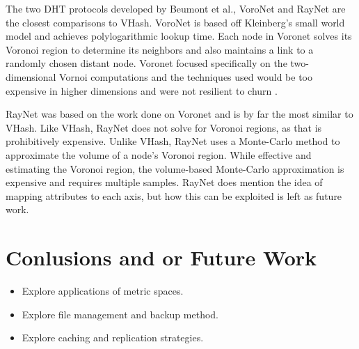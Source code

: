 \documentclass{IEEEtran}
\begin{document}
The two DHT protocols developed by Beumont et al., VoroNet \cite{voronet} and RayNet \cite{raynet} are the closest comparisons to VHash.
VoroNet is based off Kleinberg's small world model \cite{kleinberg2000navigation} and achieves polylogarithmic lookup time.  
Each node in Voronet solves its Voronoi region to determine its neighbors and also maintains a link to a randomly chosen distant node.
Voronet focused specifically on the two-dimensional Vornoi computations and the techniques used would be too expensive in higher dimensions and were not resilient to churn  \cite{raynet}.

RayNet \cite{raynet} was based on the work done on Voronet and is by far the most similar to VHash.  
Like VHash, RayNet does not solve for Voronoi regions, as that is prohibitively expensive.  
Unlike VHash, RayNet uses a Monte-Carlo method to approximate the volume of a node's Voronoi region.  
While effective and estimating the Voronoi region,  the volume-based Monte-Carlo approximation is expensive and requires multiple samples. 
RayNet does mention the idea of mapping attributes to each axis, but how this can be exploited is left as future work.



 

\section{Conlusions and or Future Work}
\begin{itemize}
\item Explore applications of metric spaces.
\item Explore file management and backup method.
\item Explore caching and replication strategies.
\end{itemize}





\end{document}
